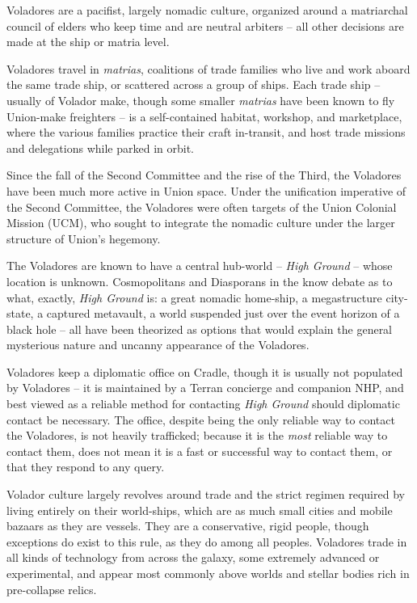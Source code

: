 Voladores are a pacifist, largely nomadic culture, organized around a matriarchal council of elders
who keep time and are neutral arbiters -- all other decisions are made at the ship or matria level.

Voladores travel in \textit{matrias}, coalitions of trade families who live and work aboard the same trade
ship, or scattered across a group of ships. Each trade ship -- usually of Volador make, though
some smaller \textit{matrias} have been known to fly Union-make freighters -- is a self-contained
habitat, workshop, and marketplace, where the various families practice their craft in-transit, and
host trade missions and delegations while parked in orbit.

Since the fall of the Second Committee and the rise of the Third, the Voladores have been much
more active in Union space. Under the unification imperative of the Second Committee, the
Voladores were often targets of the Union Colonial Mission (UCM), who sought to integrate the
nomadic culture under the larger structure of Union's hegemony.

The Voladores are known to have a central hub-world -- \textit{High Ground} -- whose location is
unknown. Cosmopolitans and Diasporans in the know debate as to what, exactly, \textit{High Ground}
is: a great nomadic home-ship, a megastructure city-state, a captured metavault, a world
suspended just over the event horizon of a black hole -- all have been theorized as options that
would explain the general mysterious nature and uncanny appearance of the Voladores.

Voladores keep a diplomatic office on Cradle, though it is usually not populated by Voladores -- it
is maintained by a Terran concierge and companion NHP, and best viewed as a reliable method
for contacting \textit{High Ground} should diplomatic contact be necessary. The office, despite being
the only reliable way to contact the Voladores, is not heavily trafficked; because it is the \textit{most}
reliable way to contact them, does not mean it is a fast or successful way to contact them, or
that they respond to any query.

Volador culture largely revolves around trade and the strict regimen required by living entirely on
their world-ships, which are as much small cities and mobile bazaars as they are vessels. They
are a conservative, rigid people, though exceptions do exist to this rule, as they do among all
peoples. Voladores trade in all kinds of technology from across the galaxy, some extremely
advanced or experimental, and appear most commonly above worlds and stellar bodies rich in
pre-collapse relics.

